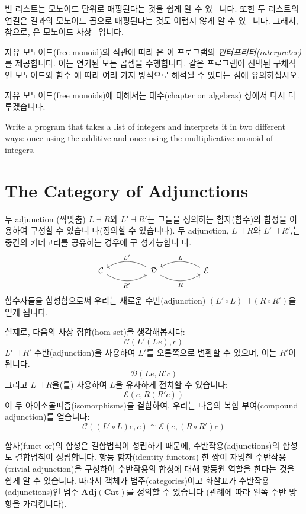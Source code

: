 \documentclass[DaoFP]{subfiles}
\begin{document}
빈 리스트는 모노이드 단위로 매핑된다는 것을 쉽게 알 수 있 ~니다. 또한 두 리스트의 연결은 결과의 모노이드 곱으로 매핑된다는 것도 어렵지 않게 알 수 있 ~니다. 그래서, 참으로, 은 모노이드 사상 ~입니다.

자유 모노이드(free monoid)의 직관에 따라 은 이 프로그램의 \emph{인터프리터(interpreter)}를 제공합니다. 이는 연기된 모든 곱셈을 수행합니다. 같은 프로그램이 선택된 구체적인 모노이드와 함수 에 따라 여러 가지 방식으로 해석될 수 있다는 점에 유의하십시오.

자유 모노이드(free monoids)에 대해서는 대수(chapter on algebras) 장에서 다시 다루겠습니다.

\begin{exercise}
Write a program that takes a list of integers and interprets it in two different ways: once using the additive and once using the multiplicative monoid of integers.
\end{exercise}

\section{The Category of Adjunctions}
두 adjunction (짝맞춤) $L \dashv R$와 $L' \dashv R'$는 그들을 정의하는 함자(함수)의 합성을 이용하여 구성할 수 있습니 다(정의할 수 있습니다). 두 adjunction, $L \dashv R$와 $L' \dashv R'$,는 중간의 카테고리를 공유하는 경우에 구 성가능합니 다.
\[
 \begin{tikzcd}
  \mathcal{C}
  \arrow[rr, bend right, "R'"']
  &&
  \mathcal{D}
  \arrow[ll, bend right, "L'"']
    \arrow[rr, bend right, "R"']
&&
  \mathcal{E}
  \arrow[ll, bend right, "L"']
 \end{tikzcd}
\]
함수자들을 합성함으로써 우리는 새로운 수반(adjunction) $(L' \circ L) \dashv (R \circ R')$을 얻게 됩니다.

실제로, 다음의 사상 집합(hom-set)을 생각해봅시다:
\[ \mathcal{C}(L' (L e), c) \]
$L' \dashv R'$ 수반(adjunction)을 사용하여 $L'$를 오른쪽으로 변환할 수 있으며, 이는 $R'$이 됩니다.
\[ \mathcal{D}(L e, R' c) \]
그리고 $L \dashv R$을(를) 사용하여 $L$을 유사하게 전치할 수 있습니다:
\[ \mathcal{E}( e, R(R' c)) \]
이 두 아이소몰피즘(isomorphisms)을 결합하여, 우리는 다음의 복합 부여(compound adjunction)를 얻습니다:
\[ \mathcal{C}((L' \circ L) e, c) \cong \mathcal{E}( e, (R \circ R') c)\]

함자(funct or)의 합성은 결합법칙이 성립하기 때문에, 수반작용(adjunctions)의 합성도 결합법칙이 성립합니다. 항등 함자(identity functors) 한 쌍이 자명한 수반작용(trivial adjunction)을 구성하여 수반작용의 합성에 대해 항등원 역할을 한다는 것을 쉽게 알 수 있습니다. 따라서 객체가 범주(categories)이고 화살표가 수반작용(adjunctions)인 범주 $\mathbf{Adj}(\mathbf{Cat})$를 정의할 수 있습니다 (관례에 따라 왼쪽 수반 방향을 가리킵니다).
\end{document}
